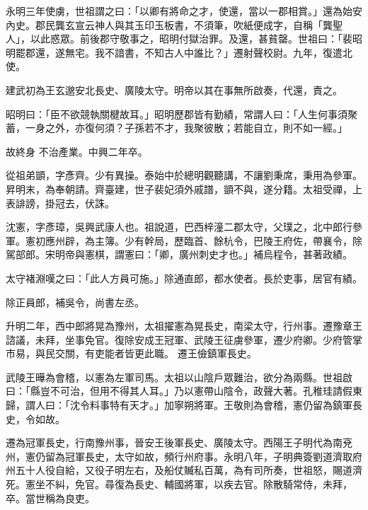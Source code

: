 \begin{pinyinscope}
 永明三年使虜，世祖謂之曰：「以卿有將命之才，使還，當以一郡相賞。」還為始安內史。郡民龔玄宣云神人與其玉印玉板書，不須筆，吹紙便成字，自稱「龔聖人」，以此惑眾。前後郡守敬事之，昭明付獄治罪。及還，甚貧罄。世祖曰：「裴昭明罷郡還，遂無宅。我不諳書，不知古人中誰比？」遷射聲校尉。九年，復遣北使。



 建武初為王玄邈安北長史、廣陵太守。明帝以其在事無所啟奏，代還，責之。



 昭明曰：「臣不欲競執關楗故耳。」昭明歷郡皆有勤績，常謂人曰：「人生何事須聚蓄，一身之外，亦復何須？子孫若不才，我聚彼散；若能自立，則不如一經。」



 故終身
 不治產業。中興二年卒。



 從祖弟顗，字彥齊。少有異操。泰始中於總明觀聽講，不讓劉秉席，秉用為參軍。昇明末，為奉朝請。齊臺建，世子裴妃須外戚譜，顗不與，遂分籍。太祖受禪，上表誹謗，掛冠去，伏誅。



 沈憲，字彥璋，吳興武康人也。祖說道，巴西梓潼二郡太守，父璞之，北中郎行參軍。憲初應州辟，為主簿。少有幹局，歷臨首、餘杭令，巴陵王府佐，帶襄令，除駕部郎。宋明帝與憲棋，謂憲曰：「卿，廣州刺史才也。」補烏程令，甚著政績。



 太守褚淵嘆之曰：「此人方員可施。」除通直郎，都水使者。長於吏事，居官有績。



 除正員郎，補吳令，尚書左丞。



 升明二年，西中郎將晃為豫州，太祖擢憲為晃長史，南梁太守，行州事。遷豫章王諮議，未拜，坐事免官。復除安成王冠軍、武陵王征虜參軍，遷少府卿。少府管掌市易，與民交關，有吏能者皆更此職。
 遷王儉鎮軍長史。



 武陵王曄為會稽，以憲為左軍司馬。太祖以山陰戶眾難治，欲分為兩縣。世祖啟曰：「縣豈不可治，但用不得其人耳。」乃以憲帶山陰令，政聲大著。孔稚珪請假東歸，謂人曰：「沈令料事特有天才。」加寧朔將軍。王敬則為會稽，憲仍留為鎮軍長史，令如故。



 遷為冠軍長史，行南豫州事，晉安王後軍長史、廣陵太守。西陽王子明代為南兗州，憲仍留為冠軍長史，太守如故，頻行州府事。永明八年，子明典簽劉道濟取府州五十人役自給，又役子明左右，及船仗贓私百萬，為有司所奏，世祖怒，賜道濟死。憲坐不糾，免官。尋復為長史、輔國將軍，以疾去官。除散騎常侍，未拜，卒。當世稱為良吏。




\end{pinyinscope}
